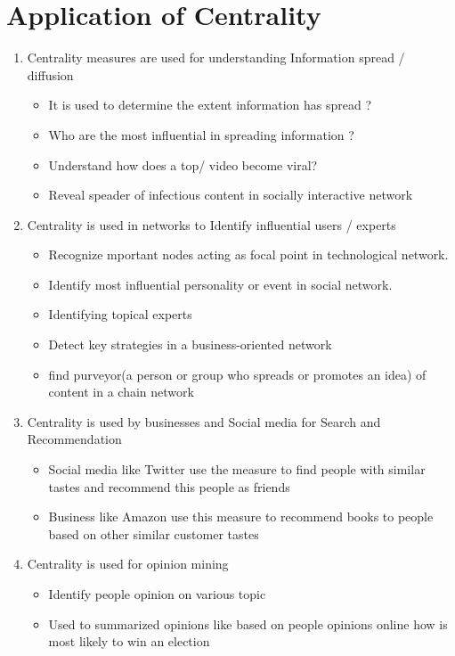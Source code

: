 \section{Application of Centrality}
\begin{enumerate}


\item Centrality measures are used for understanding Information spread / diffusion 
\begin{itemize}
\item It is used to determine the extent information has spread ?
\item Who are the most influential in spreading information ?
\item Understand how does a top/ video become viral? 
\item Reveal speader of infectious content in socially interactive network
\end{itemize}

\item Centrality is used in networks to Identify influential users / experts
\begin{itemize}
\item Recognize mportant nodes acting as focal point in technological network.
\item Identify most influential personality or event in social network.
\item Identifying topical experts
\item Detect key strategies in a business-oriented network
\item find purveyor(a person or group who spreads or promotes an idea) of content in a chain network
\end{itemize}

\item Centrality is used by businesses and Social media for Search and Recommendation
\begin{itemize}
\item Social media like Twitter use the measure to find people with similar tastes and recommend this people as friends
\item Business like Amazon use this measure to recommend books to people based on other similar customer tastes 
\end{itemize}


\item Centrality is used for opinion mining 
\begin{itemize}
\item Identify people opinion on various topic 
\item Used to summarized opinions like based on people opinions online how is most likely to win an election
\end{itemize}


\end{enumerate}
